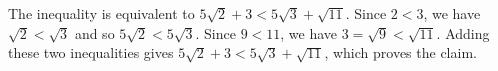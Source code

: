 The inequality is equivalent to $5\sqrt2+3<5\sqrt3+\sqrt{11}$. Since $2<3$, we have $\sqrt2<\sqrt3$ and so $5\sqrt2<5\sqrt3$. Since $9<11$, we have $3=\sqrt9<\sqrt{11}$. Adding these two inequalities gives $5\sqrt2+3<5\sqrt3+\sqrt{11}$, which proves the claim.
